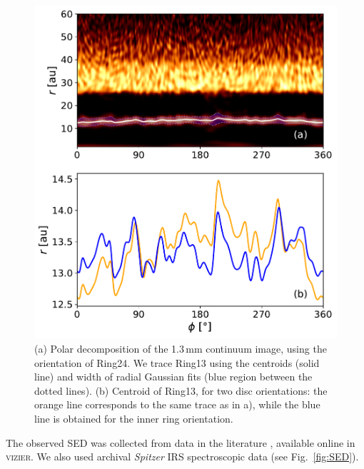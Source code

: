 \documentclass[letters,usenatbib,times]{mnras}
\begin{document}
\begin{figure}
    \includegraphics[width=\columnwidth]{polar_ring_aprox_and_diff_inner.pdf}
    \caption{(a) Polar decomposition of the 1.3\,mm continuum image, using the orientation of Ring24. We trace Ring13 using the centroids (solid line) and width of radial Gaussian fits (blue region between the dotted lines). (b) Centroid of Ring13, for two disc orientations: the orange line corresponds to the same trace as in a), while the blue line is obtained for the inner ring orientation.}
    \label{fig:polarring}
\end{figure}

The observed SED was collected from data in the literature \citep{1988iras....7.....H, 1990A&A...234..230H, Jensen_97, 2000A&A...355L..27H, 2001KFNT...17..409K, 2003yCat.2246....0C, 2007PASJ...59S.369M, 2008PASP..120.1128O, 2010A&A...514A...1I, 2012yCat.2311....0C}, available online in \textsc{vizier}. We also  used  archival \textit{Spitzer} IRS spectroscopic data (see Fig.~\ref{fig:SED}). 
\end{document}
